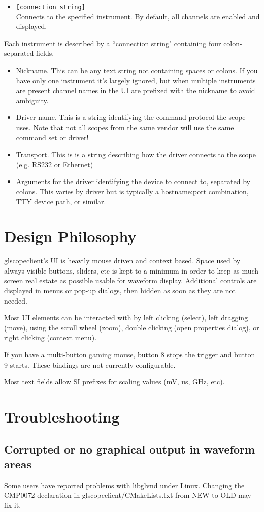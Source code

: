 \begin{itemize}
\item \texttt{[connection string]} \\
Connects to the specified instrument. By default, all channels are enabled and displayed.

\end{itemize}

Each instrument is described by a ``connection string" containing four colon-separated fields.

\begin{itemize}
\item Nickname. This can be any text string not containing spaces or colons. If you have only one instrument it's
largely ignored, but when multiple instruments are present channel names in the UI are prefixed with the nickname to
avoid ambiguity.
\item Driver name. This is a string identifying the command protocol the scope uses. Note that not all
scopes from the same vendor will use the same command set or driver!
\item Transport. This is is a string describing how the driver connects to the scope (e.g. RS232 or Ethernet)
\item Arguments for the driver identifying the device to connect to, separated by colons. This varies by driver but is
typically a hostname:port combination, TTY device path, or similar.
\end{itemize}

\section{Design Philosophy}

glscopeclient's UI is heavily mouse driven and context based. Space used by always-visible buttons, sliders, etc is
kept to a minimum in order to keep as much screen real estate as possible usable for waveform display. Additional
controls are displayed in menus or pop-up dialogs, then hidden as soon as they are not needed.

Most UI elements can be interacted with by left clicking (select), left dragging (move), using the scroll wheel (zoom),
double clicking (open properties dialog), or right clicking (context menu).

If you have a multi-button gaming mouse, button 8 stops the trigger and button 9 starts. These bindings are not
currently configurable.

Most text fields allow SI prefixes for scaling values (mV, us, GHz, etc).

\section{Troubleshooting}

\subsection{Corrupted or no graphical output in waveform areas}

Some users have reported problems with libglvnd under Linux. Changing the CMP0072 declaration in
glscopeclient/CMakeLists.txt from NEW to OLD may fix it.
